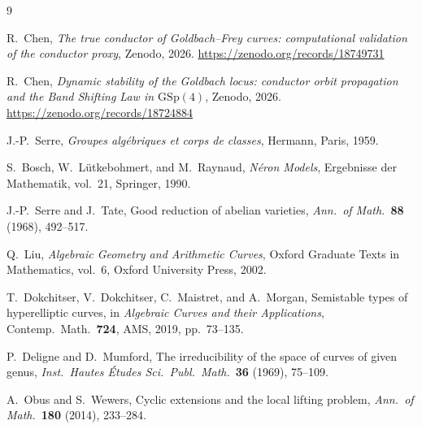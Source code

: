 \documentclass[11pt,a4paper]{article}
\newcommand{\GSp}{\mathrm{GSp}}
\theoremstyle{definition}
\theoremstyle{remark}
\begin{document}
\begin{thebibliography}{9}

R.~Chen,
\emph{The true conductor of Goldbach--Frey curves: computational
  validation of the conductor proxy},
Zenodo, 2026.
\url{https://zenodo.org/records/18749731}

R.~Chen,
\emph{Dynamic stability of the Goldbach locus: conductor orbit
  propagation and the Band Shifting Law in $\GSp(4)$},
Zenodo, 2026.
\url{https://zenodo.org/records/18724884}

J.-P.~Serre,
\emph{Groupes alg\'ebriques et corps de classes},
Hermann, Paris, 1959.

S.~Bosch, W.~L\"utkebohmert, and M.~Raynaud,
\emph{N\'eron Models},
Ergebnisse der Mathematik, vol.~21, Springer, 1990.

J.-P.~Serre and J.~Tate,
Good reduction of abelian varieties,
\emph{Ann.\ of Math.}~\textbf{88} (1968), 492--517.

Q.~Liu,
\emph{Algebraic Geometry and Arithmetic Curves},
Oxford Graduate Texts in Mathematics, vol.~6, Oxford
University Press, 2002.

T.~Dokchitser, V.~Dokchitser, C.~Maistret, and A.~Morgan,
Semistable types of hyperelliptic curves,
in \emph{Algebraic Curves and their Applications},
Contemp.\ Math.\ \textbf{724}, AMS, 2019, pp.~73--135.

P.~Deligne and D.~Mumford,
The irreducibility of the space of curves of given genus,
\emph{Inst.\ Hautes \'Etudes Sci.\ Publ.\ Math.}\ \textbf{36}
(1969), 75--109.

A.~Obus and S.~Wewers,
Cyclic extensions and the local lifting problem,
\emph{Ann.\ of Math.}~\textbf{180} (2014), 233--284.

\end{thebibliography}
\end{document}
